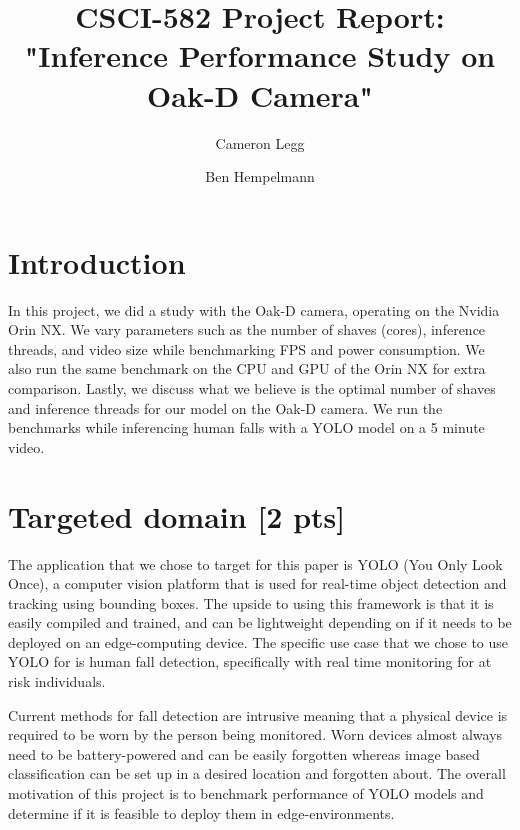 \documentclass[sigconf,authorversion,nonacm]{acmart}
\begin{document}
\title{CSCI-582 Project Report: "Inference Performance Study on Oak-D Camera"}

\author{Cameron Legg}

\author{Ben Hempelmann}

\maketitle

\section{Introduction}
In this project, we did a study with the Oak-D camera, operating on the Nvidia Orin NX. We vary parameters such as the number of shaves (cores), inference threads, and video size while benchmarking FPS and power consumption. We also run the same benchmark on the CPU and GPU of the Orin NX for extra comparison. Lastly, we discuss what we believe is the optimal number of shaves and inference threads for our model on the Oak-D camera. We run the benchmarks while inferencing human falls with a YOLO model on a 5 minute video.

\section{Targeted domain {\small [2 pts]}}

The application that we chose to target for this paper is YOLO (You Only Look Once), a computer vision platform that is used for real-time object detection and tracking using bounding boxes. The upside to using this framework is that it is easily compiled and trained, and can be lightweight depending on if it needs to be deployed on an edge-computing device. The specific use case that we chose to use YOLO for is human fall detection, specifically with real time monitoring for at risk individuals.

Current methods for fall detection are intrusive meaning that a physical device is required to be worn by the person being monitored. Worn devices almost always need to be battery-powered and can be easily forgotten whereas image based classification can be set up in a desired location and forgotten about. The overall motivation of this project is to benchmark performance of YOLO models and determine if it is feasible to deploy them in edge-environments.
\end{document}
